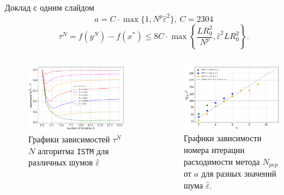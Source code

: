 \documentclass{beamer}
\begin{document}
\begin{frame}{Доклад с одним слайдом}
\begin{equation}\label{formula_for_a}
    a = C \cdot \max{\{1, N^p \hat{\varepsilon}^2\}},\ C = 2304
\end{equation}
\begin{equation}\label{eq:conv_rate_alg1_proper_a}
\tau^N = f(y^N) - f(x^*) \leq 8C \cdot \max \left\{ \frac{LR_0^2}{N^p}, \hat{\varepsilon}^2 L R_0^2 \right\}.
\end{equation}

\begin{columns}[c]
\begin{figure}
\includegraphics[width=1.0\textwidth]{convergence_rate.png}
    \caption{Графики зависимостей $\tau^N$  $N$ алгоритма \texttt{ISTM} для различных шумов $\hat{\varepsilon}$}
\end{figure}
\begin{figure}
\includegraphics[width=1.0\textwidth]{find_c.png}
    \caption{Графики зависимости номера итерации расходимости метода $N_{pep}$ от $a$ для разных значений шума $\hat{\varepsilon}$. }
    \end{figure}
\end{columns}

\end{frame}
\end{document}

